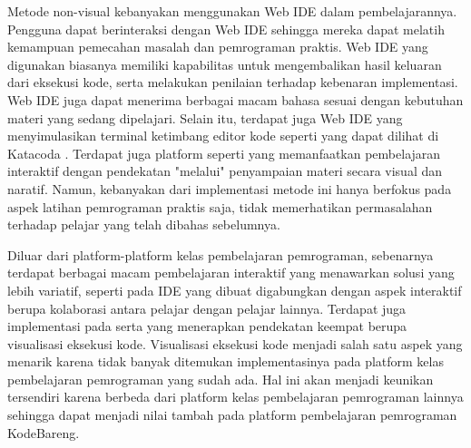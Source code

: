 Metode non-visual kebanyakan menggunakan Web IDE dalam pembelajarannya. Pengguna dapat berinteraksi dengan Web IDE sehingga mereka dapat melatih kemampuan pemecahan masalah dan pemrograman praktis. Web IDE yang digunakan biasanya memiliki kapabilitas untuk mengembalikan hasil keluaran dari eksekusi kode, serta melakukan penilaian terhadap kebenaran implementasi. Web IDE juga dapat menerima berbagai macam bahasa sesuai dengan kebutuhan materi yang sedang dipelajari. Selain itu, terdapat juga Web IDE yang menyimulasikan terminal ketimbang editor kode seperti yang dapat dilihat di Katacoda \parencite{katacoda2021media}. Terdapat juga platform seperti \textcite{progate2021media} yang memanfaatkan pembelajaran interaktif dengan pendekatan "melalui" penyampaian materi secara visual dan naratif. Namun, kebanyakan dari implementasi metode ini hanya berfokus pada aspek latihan pemrograman praktis saja, tidak memerhatikan permasalahan terhadap pelajar yang telah dibahas sebelumnya.

Diluar dari platform-platform kelas pembelajaran pemrograman, sebenarnya terdapat berbagai macam pembelajaran interaktif yang menawarkan solusi yang lebih variatif, seperti pada \textcite{tran2013interactive} IDE yang dibuat digabungkan dengan aspek interaktif berupa kolaborasi antara pelajar dengan pelajar lainnya. Terdapat juga implementasi pada \textcite{guo2013pythontutor} serta \textcite{moons2013pilot} yang menerapkan pendekatan keempat berupa visualisasi eksekusi kode. Visualisasi eksekusi kode menjadi salah satu aspek yang menarik karena tidak banyak ditemukan implementasinya pada platform kelas pembelajaran pemrograman yang sudah ada. Hal ini akan menjadi keunikan tersendiri karena berbeda dari platform kelas pembelajaran pemrograman lainnya sehingga dapat menjadi nilai tambah pada platform pembelajaran pemrograman KodeBareng.



